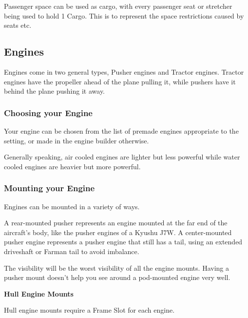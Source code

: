 \documentclass{article}
\begin{document}
Passenger space can be used as cargo, with every passenger seat
or stretcher being used to hold 1 Cargo. This is to represent the space
restrictions caused by seats etc.

\subsection{Engines}
\label{_Engines}

Engines come in two general types, Pusher engines and Tractor engines.
Tractor engines have the propeller ahead of the plane pulling it, while
pushers have it behind the plane pushing it away.

\subsubsection{Choosing your Engine}
\label{_Choosing your Engine}

Your engine can be chosen from the list of premade engines appropriate
to the setting, or made in the engine builder otherwise.

Generally speaking, air cooled engines are lighter but less powerful
while water cooled engines are heavier but more powerful.

\subsubsection{Mounting your Engine}
\label{_Mounting your Engine}

Engines can be mounted in a variety of ways.

A rear-mounted pusher represents an engine mounted at the far end of the
aircraft's body, like the pusher engines of a Kyushu J7W. A
center-mounted pusher engine represents a pusher engine that still has a
tail, using an extended driveshaft or Farman tail to avoid imbalance.

The visibility will be the worst visibility of all the engine mounts.
Having a pusher mount doesn't help you see around a pod-mounted engine very well.

\textbf{Hull Engine Mounts}

Hull engine mounts require a Frame Slot for each engine.
\end{document}
